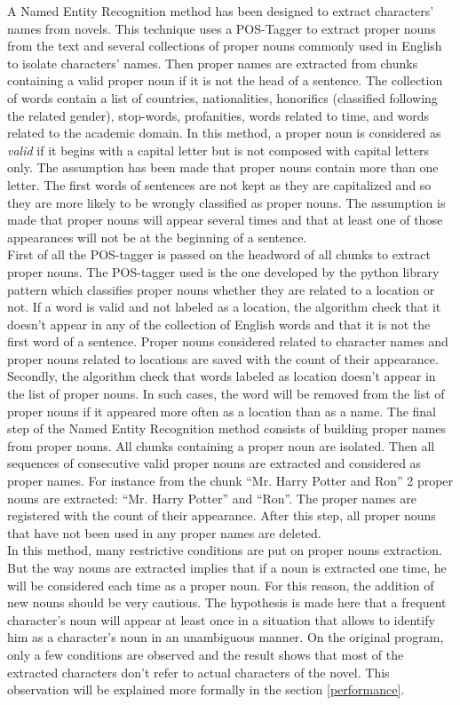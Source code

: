 \documentclass[a4paper, 12pt]{report}
\begin{document}
A Named Entity Recognition method has been designed to extract characters' names from novels.
This technique uses a POS-Tagger to extract proper nouns from the text and several collections of proper nouns commonly used in English to isolate characters' names.
Then proper names are extracted from chunks containing a valid proper noun if it is not the head of a sentence.
The collection of words contain a list of countries, nationalities, honorifics (classified following the related gender), stop-words, profanities,
words related to time, and words related to the academic domain.
In this method, a proper noun is considered as \textit{valid} if it begins with a capital letter but is not composed with capital letters only.
The assumption has been made that proper nouns contain more than one letter.
The first words of sentences are not kept as they are capitalized and so they are more likely to be wrongly classified as proper nouns.
The assumption is made that proper nouns will appear several times and that at least one of those appearances will not be at the beginning of a sentence.\\

First of all the POS-tagger is passed on the headword of all chunks to extract proper nouns.
The POS-tagger used is the one developed by the python library pattern which classifies proper nouns whether they are related to a location or not.
If a word is valid and not labeled as a location, the algorithm check that it doesn't appear in any of the collection of English words and that
it is not the first word of a sentence. Proper nouns considered related to character names and proper nouns related to locations are saved with the count of their appearance.
Secondly, the algorithm check that words labeled as location doesn't appear in the list of proper nouns.
In such cases, the word will be removed from the list of proper nouns if it appeared more often as a location than as a name.
The final step of the Named Entity Recognition method consists of building proper names from proper nouns.
All chunks containing a proper noun are isolated.
Then all sequences of consecutive valid proper nouns are extracted and considered as proper names.
For instance from the chunk ``Mr. Harry Potter and Ron'' 2 proper nouns are extracted: ``Mr. Harry Potter'' and ``Ron''.
The proper names are registered with the count of their appearance. After this step, all proper nouns that have not been used in any proper names are deleted.\\

In this method, many restrictive conditions are put on proper nouns extraction.
But the way nouns are extracted implies that if a noun is extracted one time, he will be considered each time as a proper noun.
For this reason, the addition of new nouns should be very cautious.
The hypothesis is made here that a frequent character's noun will appear at least once in a situation that allows to identify him as a character's noun in an unambiguous manner.
On the original program, only a few conditions are observed and the result shows that most of the extracted characters don't refer to actual characters of the novel.
This observation will be explained more formally in the section \ref{performance}.
\end{document}
